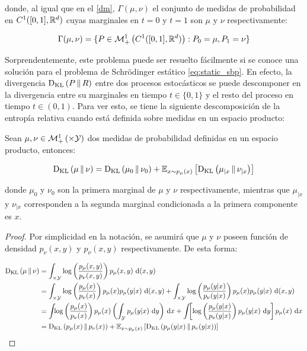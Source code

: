 donde, al igual que en el \autoref{dm}, $\Gamma(\mu,\nu)$ el conjunto de medidas de probabilidad en $C^1([0,1],\mathbb{R}^d)$ cuyas marginales en $t=0$ y $t=1$ son $\mu$ y $\nu$ respectivamente:

\begin{equation*}
	\Gamma(\mu,\nu) = \{P\in \mathcal{M}_+^1\left(C^1([0,1],\mathbb{R}^d)\right): P_0=\mu, P_1 = \nu\}
\end{equation*}

Sorprendentemente, este problema puede ser resuelto fácilmente si se conoce una solución para el problema de Schrödinger estático \eqref{eq:static_sbp}. En efecto, la divergencia $\operatorname{D_{KL}}\left(P\,\|\,R\right)$ entre dos procesos estocásticos se puede descomponer en la divergencia entre su marginales en tiempo $t\in\{0,1\}$ y el resto del proceso en tiempo $t\in(0,1)$. Para ver esto, se tiene la siguiente descomposición de la entropía relativa cuando está definida sobre medidas en un espacio producto:

\begin{prop}
	Sean $\mu,\nu\in\probmeasure{\xspace\times\yspace}$ dos medidas de probabilidad definidas en un espacio producto, entonces:

	\begin{equation*}
		\operatorname{D_{KL}}\left(\mu\,\|\,\nu\right) = \operatorname{D_{KL}}\left(\mu_0\,\|\,\nu_0\right) + \mathbb{E}_{x\sim p_\mu(x)}\left[\operatorname{D_{KL}}\left(\mu_{|x}\,\|\,\nu_{|x}\right)\right]
	\end{equation*}

	donde $\mu_0$ y $\nu_0$ son la primera marginal de $\mu$ y $\nu$ respectivamente, mientras que $\mu_{|x}$ y $\nu_{|x}$ corresponden a la segunda marginal condicionada a la primera componente es $x$.
\end{prop}

\begin{proof}
	Por simplicidad en la notación, se asumirá que $\mu$ y $\nu$ poseen función de densidad $p_\nu(x,y)$ y $p_\nu(x,y)$ respectivamente. De esta forma:

	\begin{align*}
		\operatorname{D_{KL}}\left(\mu\,\|\,\nu\right) &= \int_{\times\mathcal{Y}} \log\left(\frac{p_\mu(x,y)}{p_\nu(x,y)}\right) p_\mu(x,y) \,\operatorname{d}\!\,(x,y)\\
		&= \int_{\times\mathcal{Y}} \log\left(\frac{p_\mu(x)}{p_\nu(x)}\right) p_\mu(x)p_\mu(y|x) \,\operatorname{d}\!\,(x,y) + \int_{\times\mathcal{Y}} \log\left(\frac{p_\mu(y|x)}{p_\nu(y|x)}\right) p_\mu(x)p_\mu(y|x) \,\operatorname{d}\!\,(x,y)\\
		&= \int_{} \log\left(\frac{p_\mu(x)}{p_\nu(x)}\right) p_\mu(x)\left(\int_{\mathcal{Y}} p_\mu(y|x) \,\operatorname{d}\! y\right)\,\operatorname{d}\! x + \int_{} \left[\log\left(\frac{p_\mu(y|x)}{p_\nu(y|x)}\right) p_\mu(y|x) \,\operatorname{d}\! y\right]p_\mu(x) \,\operatorname{d}\! x\\
		&= \operatorname{D_{KL}}\left(p_\mu(x)\,\|\,p_\nu(x)\right) + \mathbb{E}_{x\sim p_\mu(x)}\left[\operatorname{D_{KL}}\left(p_\mu(y|x)\,\|\,p_\nu(y|x)\right)\right]
	\end{align*}
\end{proof}

